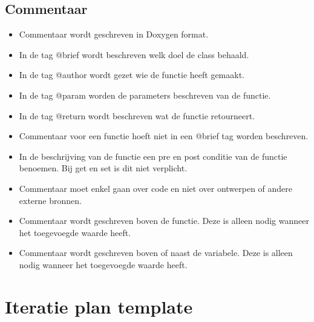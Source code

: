 \documentclass[a4paper, 11pt, oneside]{report}
\begin{document}
\section{Commentaar}

\begin{itemize}
\item Commentaar wordt geschreven in Doxygen format.
\item In de tag @brief wordt beschreven welk doel de class behaald.
\item In de tag @author wordt gezet wie de functie heeft gemaakt.
\item In de tag @param worden de parameters beschreven van de functie. 
\item In de tag @return wordt beschreven wat de functie retourneert.
\item Commentaar voor een functie hoeft niet in een @brief tag worden beschreven.
\item In de beschrijving van de functie een pre en post conditie van de functie benoemen. Bij get en set is dit niet verplicht. 
\item Commentaar moet enkel gaan over code en niet over ontwerpen of andere externe bronnen.
\item Commentaar wordt geschreven boven de functie. Deze is alleen nodig wanneer het toegevoegde waarde heeft.
\item Commentaar wordt geschreven boven of naast de variabele. Deze is alleen nodig wanneer het toegevoegde waarde heeft.
\end{itemize}

\chapter{Iteratie plan template}
\label{app:iteratieplan}
\end{document}
